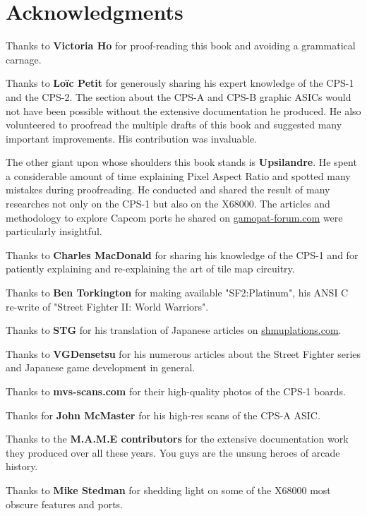 \chapter*{Acknowledgments} 

Thanks to \textbf{Victoria Ho} for proof-reading this book and avoiding a grammatical carnage.

Thanks to \textbf{Lo\"{i}c Petit} for generously sharing his expert knowledge of the CPS-1 and the CPS-2. The section about the CPS-A and CPS-B graphic ASICs would not have been possible without the extensive documentation he produced. He also volunteered to proofread the multiple drafts of this book and suggested many important improvements. His contribution was invaluable.

The other giant upon whose shoulders this book stands is \textbf{Upsilandre}. He spent a considerable amount of time explaining Pixel Aspect Ratio and spotted many mistakes during proofreading. He conducted and shared the result of many researches not only on the CPS-1 but also on the X68000. The articles and methodology to explore Capcom ports he shared on \href{https://www.gamopat-forum.com}{gamopat-forum.com} were particularly insightful.

Thanks to \textbf{Charles MacDonald} for sharing his knowledge of the CPS-1 and for patiently explaining and re-explaining the art of tile map circuitry.

Thanks to \textbf{Ben Torkington} for making available "SF2:Platinum", his ANSI C re-write of "Street Fighter II: World Warriors".

Thanks to \textbf{STG} for his translation of Japanese articles on \href{https://shmuplations.com}{shmuplations.com}.

Thanks to \textbf{VGDensetsu} for his numerous articles about the Street Fighter series and Japanese game development in general.

Thanks to \textbf{mvs-scans.com} for their high-quality photos of the CPS-1 boards.

Thanks for \textbf{John McMaster} for his high-res scans of the CPS-A ASIC.

Thanks to the \textbf{M.A.M.E contributors} for the extensive documentation work they produced over all these years. You guys are the unsung heroes of arcade history.

Thanks to \textbf{Mike Stedman} for shedding light on some of the X68000 most obscure features and ports.